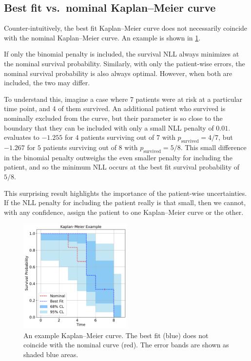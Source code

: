 \documentclass[article]{jss}
\newcommand{\KM}{Kaplan--Meier} %
\begin{document}
\subsection%
[Best fit vs. nominal \KM{} curve]%
{Best fit vs.\ nominal \KM{} curve}

Counter-intuitively, the best fit \KM{} curve does not necessarily coincide with the nominal \KM{} curve.  An example is shown in \cref{fig:best-fit-vs-nominal}.

If only the binomial penalty is included, the survival NLL always minimizes at the nominal survival probability.  Similarly, with only the patient-wise errors, the nominal survival probability is also always optimal.  However, when both are included, the two may differ.

To understand this, imagine a case where 7 patients were at risk at a particular time point, and 4 of them survived.  An additional patient who survived is nominally excluded from the curve, but their parameter is so close to the boundary that they can be included with only a small NLL penalty of \(0.01\)\@.   evaluates to \(-1.255\) for \(4\) patients surviving out of \(7\) with \(p_\text{survived}=4/7\), but \(-1.267\) for \(5\) patients surviving out of \(8\) with \(p_\text{survived}=5/8\).  This small difference in the binomial penalty outweighs the even smaller penalty for including the patient, and so the minimum NLL occurs at the best fit survival probability of \(5/8\).

This surprising result highlights the importance of the patient-wise uncertainties.  If the NLL penalty for including the patient really is that small, then we cannot, with any confidence, assign the patient to one \KM{} curve or the other.

\begin{figure}
  \centering
  \includegraphics[width=0.5\textwidth]{km_example.pdf}
  \caption{\label{fig:best-fit-vs-nominal} An example \KM{} curve.  The best fit (blue) does not coincide with the nominal curve (red).  The error bands are shown as shaded blue areas.}
\end{figure}
\end{document}
